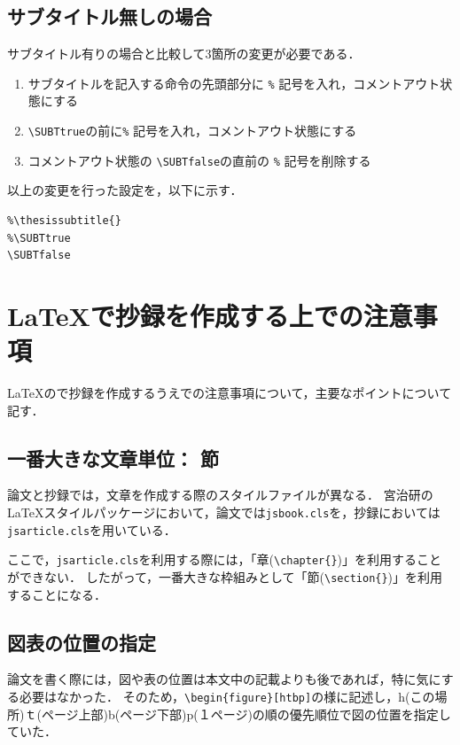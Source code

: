 \subsection{サブタイトル無しの場合}
サブタイトル有りの場合と比較して3箇所の変更が必要である．
\begin{enumerate}
\item サブタイトルを記入する命令の先頭部分に \verb+%+ 記号を入れ，コメントアウト状態にする
\item \verb+\SUBTtrue+の前に\verb+%+ 記号を入れ，コメントアウト状態にする
\item コメントアウト状態の \verb+\SUBTfalse+の直前の \verb+%+ 記号を削除する
\end{enumerate}
以上の変更を行った設定を，以下に示す．
\begin{screen}
{\small
\begin{verbatim}
%\thesissubtitle{}
%\SUBTtrue
\SUBTfalse
\end{verbatim}
}
\end{screen}


\section{\LaTeX で抄録を作成する上での注意事項}
\LaTeX ので抄録を作成するうえでの注意事項について，主要なポイントについて記す．

\subsection{一番大きな文章単位： 節}
論文と抄録では，文章を作成する際のスタイルファイルが異なる．
宮治研の\LaTeX スタイルパッケージにおいて，論文では\verb+jsbook.cls+を，抄録においては\verb+jsarticle.cls+を用いている．

ここで，\verb+jsarticle.cls+を利用する際には，「章(\verb+\chapter{}+)」を利用することができない．
したがって，一番大きな枠組みとして「節(\verb+\section{}+)」を利用することになる．

\subsection{図表の位置の指定}
論文を書く際には，図や表の位置は本文中の記載よりも後であれば，特に気にする必要はなかった．
そのため，\verb+\begin{figure}[htbp]+の様に記述し，h(この場所)ｔ(ページ上部)b(ページ下部)p(１ページ)の順の優先順位で図の位置を指定していた．

